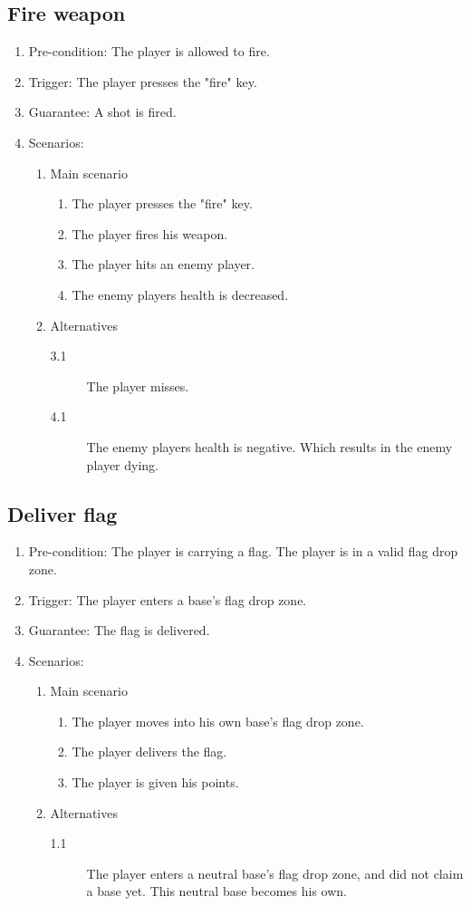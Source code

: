 \documentclass[a4paper,twoside,11pt]{article}
\begin{document}
\subsection*{Fire weapon}
\begin{enumerate}
\item Pre-condition: The player is allowed to fire.
\item Trigger: The player presses the "fire" key.
\item Guarantee: A shot is fired.
\item Scenarios: 
	\begin{enumerate}
	\item Main scenario
		\begin{enumerate}[1)]
		\item The player presses the "fire" key.
		\item The player fires his weapon.
		\item The player hits an enemy player.
		\item The enemy players health is decreased.
		\end{enumerate}
	\item Alternatives
		\begin{description}
		\item[3.1] The player misses.
		\item[4.1] The enemy players health is negative. Which 					results in the enemy player dying.
		\end{description}
	\end{enumerate}
\end{enumerate}
\subsection*{Deliver flag}
\begin{enumerate}
\item Pre-condition: The player is carrying a flag. The player is in a valid flag drop zone.
\item Trigger: The player enters a base's flag drop zone.
\item Guarantee: The flag is delivered.
\item Scenarios: 
	\begin{enumerate}
	\item Main scenario
		\begin{enumerate}[1)]
		\item The player moves into his own base's flag drop zone.
		\item The player delivers the flag.
		\item The player is given his points.
		\end{enumerate}
	\item Alternatives
		\begin{description}
		\item[1.1] The player enters a neutral base's flag drop zone, 			and did	not claim a base yet. This neutral base becomes his 			own.
		\end{description}
	\end{enumerate}
\end{enumerate}
\end{document}
